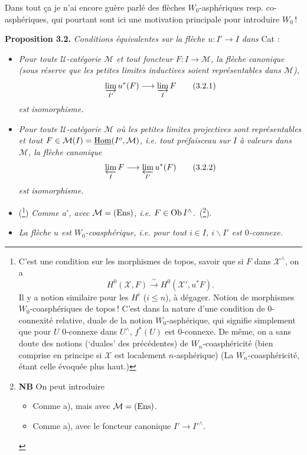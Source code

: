 Dans tout ça je n'ai encore guère parlé des flèches $W_0$-asphériques resp. co-asphériques, qui pourtant sont ici une motivation principale pour introduire $W_0$\,!

\noindent\textbf{Proposition 3.2.} \textit{Conditions équivalentes sur la flèche $u : I' \longrightarrow I$ dans} Cat :
\begin{itemize}
\item[a)] \textit{Pour toute $\mathcal{U}$-catégorie $\mathcal{M}$ et tout foncteur $F : I \longrightarrow \mathcal{M}$, la flèche canonique (sous réserve que les petites limites inductives soient représentables dans $\mathcal{M}$),}
\[
\varinjlim_{I'} u^*(F) \longrightarrow \varinjlim_{I} F \tag*{(3.2.1)}
\]
\textit{est} \textit{isomorphisme.}
\item[a$'$)] \textit{Pour toute $\mathcal{U}$-catégorie $\mathcal{M}$ où les petites limites projectives sont représentables et tout $F \in \mathcal{M}(I) = \underline{\operatorname{Hom}}(I^o,\mathcal{M})$, i.e. tout préfaisceau sur $I$ à valeurs dans $\mathcal{M}$, la flèche canonique}
\[
\varprojlim_{I} F \longrightarrow \varprojlim_{I'} u^*(F) \tag*{(3.2.2)}
\]
\textit{est} \textit{isomorphisme.}
\item[a$''$)] (\footnote[53]{C'est une condition sur les morphismes de topos, savoir que si $F$ dans $\mathcal{X}^{\wedge}$, on a
\[
H^0(\mathcal{X},F) \xrightarrow{\;\sim\;} H^0(\mathcal{X}',u^*F).
\]
Il y a notion similaire pour les $H^i$ ($i \leq n$), à dégager. Notion de morphismes $W_0$-coasphériques de topos\,! C'est dans la nature d'une condition de 0-connexité relative, duale de la notion $W_0$-asphérique, qui signifie simplement que pour $U$ 0-connexe dans $U^{\wedge}$, $f^*(U)$ est 0-connexe. De même, on a sans doute des notions (‘duales’ des précédentes) de $W_n$-coasphéricité (bien comprise en principe si $\mathcal{X}$ est localement $n$-asphérique) (La $W_n$-coasphéricité, étant celle évoquée plus haut.)}) \textit{Comme a$'$, avec $\mathcal{M} = (\mathrm{Ens})$, i.e. $F \in \operatorname{Ob} I^{\wedge}$.}~(\footnote[54]{\textbf{NB} On peut introduire
\begin{itemize}
\item[a$'''$)] Comme a), mais avec $\mathcal{M} = (\mathrm{Ens})$.
\item[a$^{IV}$)] Comme a), avec le foncteur canonique $I' \longrightarrow I'^{\wedge}$.
\end{itemize}}).
\item[b)] \textit{La flèche $u$ est $W_0$-coasphérique, i.e. pour tout $i \in I$, $i\backslash I'$ est $0$-connexe.}
\end{itemize}
